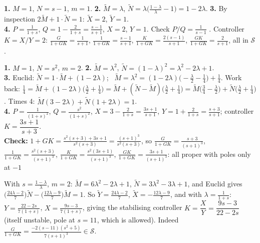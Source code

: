 \begin{workbox}[title={Worked example A: $G(s)=\dfrac1{s-1}$}]
\textbf{1.} $M=1$, $N=s-1$, $m=1$.\quad
\textbf{2.} $\tilde M=\lambda$, $\tilde N=\lambda\big(\frac{1-\lambda}\lambda-1\big)=1-2\lambda$.\quad
\textbf{3.} By inspection $2\tilde M+1\cdot\tilde N=1$: $\tilde X=2$, $\tilde Y=1$.\\
\textbf{4.} $P=\frac1{1+s}$, $Q=1-\frac2{1+s}=\frac{s-1}{s+1}$, $X=2$, $Y=1$. Check $P/Q=\frac1{s-1}$ \checkmark. Controller $K=X/Y=2$:
$\frac{G}{1+GK}=\frac1{s+1}$, $\frac1{1+GK}=\frac{s-1}{s+1}$, $\frac{K}{1+GK}=\frac{2(s-1)}{s+1}$, $\frac{GK}{1+GK}=\frac2{s+1}$, all in $\mathcal S$.
\end{workbox}

\begin{workbox}[title={Worked example B: $G(s)=\dfrac1{s^2}$ (double integrator)}]
\textbf{1.} $M=1$, $N=s^2$, $m=2$.\quad
\textbf{2.} $\tilde M=\lambda^2$, $\tilde N=(1-\lambda)^2=\lambda^2-2\lambda+1$.\\
\textbf{3.} Euclid: $\tilde N=1\cdot\tilde M+(1-2\lambda)$; \ $\tilde M=\lambda^2=(1-2\lambda)\big(-\frac\lambda2-\frac14\big)+\frac14$. Work back:
$\frac14=\tilde M+(1-2\lambda)\big(\frac\lambda2+\frac14\big)=\tilde M+(\tilde N-\tilde M)\big(\frac\lambda2+\frac14\big)=\tilde M\big(\tfrac34-\tfrac\lambda2\big)+\tilde N\big(\tfrac\lambda2+\tfrac14\big)$.
Times 4: $\tilde M(3-2\lambda)+\tilde N(1+2\lambda)=1$.\\
\textbf{4.} $P=\frac1{(1+s)^2}$, $Q=\frac{s^2}{(1+s)^2}$, $X=3-\frac2{1+s}=\frac{3s+1}{s+1}$, $Y=1+\frac2{1+s}=\frac{s+3}{s+1}$; controller $K=\dfrac{3s+1}{s+3}$.\\
\textbf{Check:} $1+GK=\frac{s^2(s+3)+3s+1}{s^2(s+3)}=\frac{(s+1)^3}{s^2(s+3)}$, so $\frac{G}{1+GK}=\frac{s+3}{(s+1)^3}$, $\frac1{1+GK}=\frac{s^2(s+3)}{(s+1)^3}$, $\frac{K}{1+GK}=\frac{s^2(3s+1)}{(s+1)^3}$, $\frac{GK}{1+GK}=\frac{3s+1}{(s+1)^3}$: all proper with poles only at $-1$ \checkmark
\end{workbox}

\begin{workbox}[title={Worked example C \fr{196}: $G(s)=\dfrac{s^2+5}{s^2-s+1}$}]
With $s=\frac{1-\lambda}{\lambda}$, $m=2$: $\tilde M=6\lambda^2-2\lambda+1$, $\tilde N=3\lambda^2-3\lambda+1$, and Euclid gives
$\big(\tfrac{24\lambda-2}{7}\big)\tilde N-\big(\tfrac{12\lambda-9}{7}\big)\tilde M=1$. So $\tilde Y=\frac{24\lambda-2}7$, $\tilde X=-\frac{12\lambda-9}{7}$, and with $\lambda=\frac1{1+s}$:
$Y=\frac{22-2s}{7(1+s)}$, $X=\frac{9s-3}{7(1+s)}$, giving the stabilising controller $K=\dfrac XY=\dfrac{9s-3}{22-2s}$ (itself unstable, pole at $s=11$, which is allowed).
Indeed $\frac{G}{1+GK}=\frac{-2(s-11)(s^2+5)}{7(s+1)^3}\in\mathcal S$.
\end{workbox}

